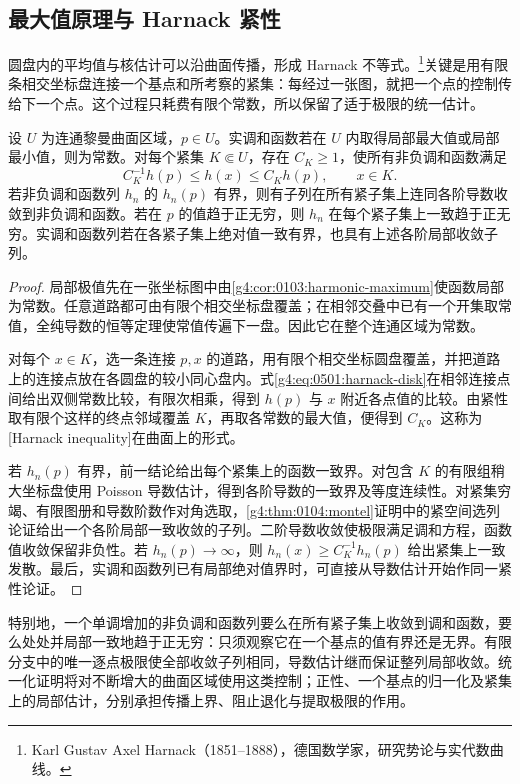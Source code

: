 \subsection{最大值原理与 Harnack 紧性}
\label{g4:subsec:0501:05}

圆盘内的平均值与核估计可以沿曲面传播，形成 Harnack 不等式。\footnote{Karl Gustav Axel Harnack（1851--1888），德国数学家，研究势论与实代数曲线。}关键是用有限条相交坐标盘连接一个基点和所考察的紧集：每经过一张图，就把一个点的控制传给下一个点。这个过程只耗费有限个常数，所以保留了适于极限的统一估计。

\begin{proposition}
	\label{g4:prop:0501:harnack-compactness}
	设 \(U\) 为连通黎曼曲面区域，\(p\in U\)。实调和函数若在 \(U\) 内取得局部最大值或局部最小值，则为常数。对每个紧集 \(K\Subset U\)，存在 \(C_K\ge1\)，使所有非负调和函数满足
	\[
		C_K^{-1}h(p)\le h(x)\le C_Kh(p),\qquad x\in K.
	\]
	若非负调和函数列 \(h_n\) 的 \(h_n(p)\) 有界，则有子列在所有紧子集上连同各阶导数收敛到非负调和函数。若在 \(p\) 的值趋于正无穷，则 \(h_n\) 在每个紧子集上一致趋于正无穷。实调和函数列若在各紧子集上绝对值一致有界，也具有上述各阶局部收敛子列。
\end{proposition}
\begin{proof}
	局部极值先在一张坐标图中由\cref{g4:cor:0103:harmonic-maximum}使函数局部为常数。任意道路都可由有限个相交坐标盘覆盖；在相邻交叠中已有一个开集取常值，全纯导数的恒等定理使常值传遍下一盘。因此它在整个连通区域为常数。

	对每个 \(x\in K\)，选一条连接 \(p,x\) 的道路，用有限个相交坐标圆盘覆盖，并把道路上的连接点放在各圆盘的较小同心盘内。式\eqref{g4:eq:0501:harnack-disk}在相邻连接点间给出双侧常数比较，有限次相乘，得到 \(h(p)\) 与 \(x\) 附近各点值的比较。由紧性取有限个这样的终点邻域覆盖 \(K\)，再取各常数的最大值，便得到 \(C_K\)。这称为[Harnack inequality]在曲面上的形式。

	若 \(h_n(p)\) 有界，前一结论给出每个紧集上的函数一致界。对包含 \(K\) 的有限组稍大坐标盘使用 Poisson 导数估计，得到各阶导数的一致界及等度连续性。对紧集穷竭、有限图册和导数阶数作对角选取，\cref{g4:thm:0104:montel}证明中的紧空间选列论证给出一个各阶局部一致收敛的子列。二阶导数收敛使极限满足调和方程，函数值收敛保留非负性。若 \(h_n(p)\to\infty\)，则 \(h_n(x)\ge C_K^{-1}h_n(p)\) 给出紧集上一致发散。最后，实调和函数列已有局部绝对值界时，可直接从导数估计开始作同一紧性论证。
\end{proof}

特别地，一个单调增加的非负调和函数列要么在所有紧子集上收敛到调和函数，要么处处并局部一致地趋于正无穷：只须观察它在一个基点的值有界还是无界。有限分支中的唯一逐点极限使全部收敛子列相同，导数估计继而保证整列局部收敛。统一化证明将对不断增大的曲面区域使用这类控制；正性、一个基点的归一化及紧集上的局部估计，分别承担传播上界、阻止退化与提取极限的作用。
